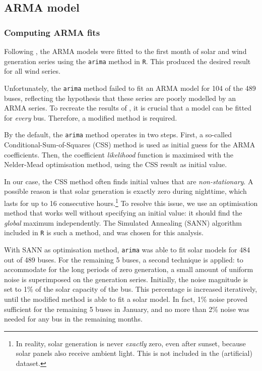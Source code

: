 \documentclass[main.tex]{subfiles}
\begin{document}
\subsection{ARMA model}

\subsubsection{Computing ARMA fits}\label{arimamod}
Following \cite{Nesti2018emergentfailures}, the ARMA models were fitted to the first month of solar and wind generation series using the \texttt{arima} method in \texttt{R}. This produced the desired result for all wind series.

Unfortunately, the \texttt{arima} method failed to fit an ARMA model for 104 of the 489 buses, reflecting the hypothesis that these series are poorly modelled by an ARMA series. To recreate the results of \cite{Nesti2018emergentfailures}, it is crucial that a model can be fitted for \emph{every} bus. Therefore, a modified method is required.

By the default, the \texttt{arima} method operates in two steps. First, a so-called Conditional-Sum-of-Squares (CSS) method is used as initial guess for the ARMA coefficients. Then, the coefficient \emph{likelihood} function is maximised with the Nelder-Mead optimisation method, using the CSS result as initial value. 

In our case, the CSS method often finds initial values that are \emph{non-stationary}. A possible reason is that solar generation is exactly zero during nighttime, which lasts for up to 16 consecutive hours.\footnote{In reality, solar generation is never \emph{exactly} zero, even after sunset, because solar panels also receive ambient light. This is not included in the (artificial) dataset.
}
To resolve this issue, we use an optimisation method that works well without specifying an initial value: it should find the \emph{global} maximum independently. The Simulated Annealing (SANN) algorithm included in \texttt{R} is such a method, and was chosen for this analysis. 

With SANN as optimisation method, \texttt{arima} was able to fit solar models for 484 out of 489 buses. For the remaining 5 buses, a second technique is applied: to accommodate for the long periods of zero generation, a small amount of uniform noise is superimposed on the generation series. Initially, the noise magnitude is set to 1\% of the solar capacity of the bus. This percentage is increased iteratively, until the modified method is able to fit a solar model. In fact, 1\% noise proved sufficient for the remaining 5 buses in January, and no more than 2\% noise was needed for any bus in the remaining months. 
\end{document}
